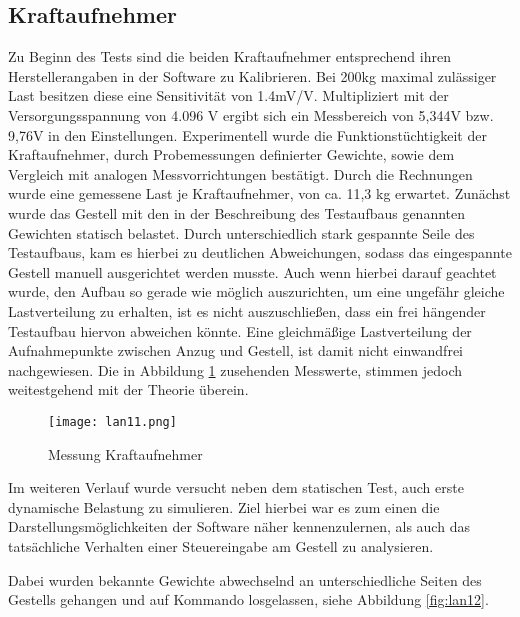 \subsection{Kraftaufnehmer}
Zu Beginn des Tests sind die beiden Kraftaufnehmer entsprechend ihren Herstellerangaben in der Software zu Kalibrieren.
Bei 200kg maximal zulässiger Last besitzen diese eine Sensitivität von 1.4mV/V.
Multipliziert mit der Versorgungsspannung von 4.096 V ergibt sich ein Messbereich von 5,344V bzw. 9,76V in den Einstellungen.
Experimentell wurde die Funktionstüchtigkeit der Kraftaufnehmer, durch Probemessungen definierter Gewichte, sowie dem Vergleich mit analogen Messvorrichtungen bestätigt. 
Durch die Rechnungen wurde eine gemessene Last je Kraftaufnehmer, von ca. 11,3 kg erwartet.
Zunächst wurde das Gestell mit den in der Beschreibung des Testaufbaus genannten Gewichten statisch belastet.
Durch unterschiedlich stark gespannte Seile des Testaufbaus, kam es hierbei zu deutlichen Abweichungen, sodass das eingespannte Gestell manuell ausgerichtet werden musste.
Auch wenn hierbei darauf geachtet wurde, den Aufbau so gerade wie möglich auszurichten, um eine ungefähr gleiche Lastverteilung zu erhalten, ist es nicht auszuschließen,
dass ein frei hängender Testaufbau hiervon abweichen könnte. Eine gleichmäßige Lastverteilung der Aufnahmepunkte zwischen Anzug und Gestell, ist damit nicht einwandfrei nachgewiesen. Die in Abbildung \ref{fig:lan11} zusehenden Messwerte, stimmen jedoch weitestgehend mit der Theorie überein.

\begin{figure}[htbp]
    \begin{center}
        \texttt{[image: lan11.png]}
        \caption[Messung Kraftaufnehmer (Abbildungsverzeichnis)]{Messung Kraftaufnehmer}
        
        \label{fig:lan11}
    \end{center}
\end{figure}

Im weiteren Verlauf wurde versucht neben dem statischen Test, auch erste dynamische Belastung zu simulieren.
Ziel hierbei war es zum einen die Darstellungsmöglichkeiten der Software näher kennenzulernen, als auch das tatsächliche Verhalten einer Steuereingabe am Gestell zu analysieren. 

Dabei wurden bekannte Gewichte abwechselnd an unterschiedliche Seiten des Gestells gehangen und auf Kommando losgelassen, siehe Abbildung \ref{fig:lan12}.

